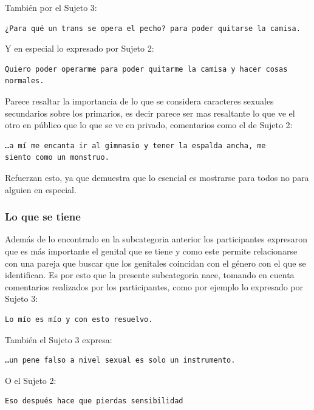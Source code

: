 También por el Sujeto 3:

\begin{verbatim}
¿Para qué un trans se opera el pecho? para poder quitarse la camisa.
\end{verbatim}

Y en especial lo expresado por Sujeto 2:
\begin{verbatim}
Quiero poder operarme para poder quitarme la camisa y hacer cosas normales.
\end{verbatim}

Parece resaltar la importancia de lo que se considera caracteres sexuales
secundarios sobre los primarios, es decir parece ser mas resaltante lo que ve el
otro en público que lo que se ve en privado, comentarios como el de Sujeto 2:

\begin{verbatim}
…a mí me encanta ir al gimnasio y tener la espalda ancha, me
siento como un monstruo.
\end{verbatim}

Refuerzan esto, ya que demuestra que lo esencial es mostrarse para todos no para
alguien en especial.

\subsubsection{Lo que se tiene}

Además de lo encontrado en la subcategoria anterior los participantes expresaron
que es más importante el genital que se tiene y como este permite relacionarse
con una pareja que buscar que los genitales coincidan con el género con el que
se identifican. Es por esto que la presente subcategoria nace, tomando en cuenta
comentarios realizados por los participantes, como por ejemplo lo expresado por
Sujeto 3:


\begin{verbatim}
Lo mío es mío y con esto resuelvo.
\end{verbatim}

 También el Sujeto 3 expresa:

 \begin{verbatim}
…un pene falso a nivel sexual es solo un instrumento.
 \end{verbatim}

O el Sujeto 2:

\begin{verbatim}
Eso después hace que pierdas sensibilidad
\end{verbatim}

